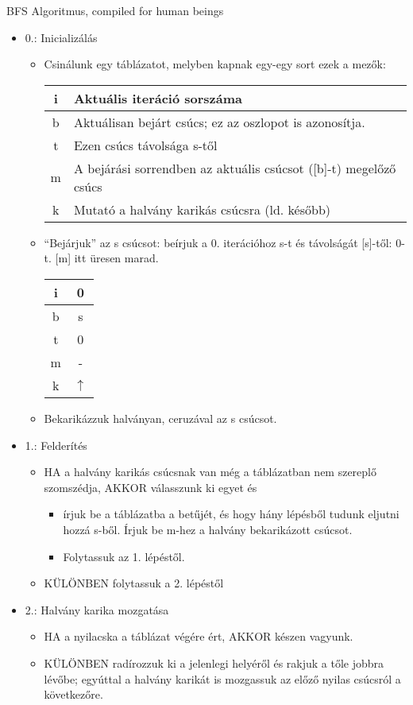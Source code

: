 \begin{tetel}{BFS Algoritmus, compiled for human beings}
  \begin{itemize}
  \item 0.: Inicializálás
    \begin{itemize}
    \item Csinálunk egy táblázatot, melyben kapnak egy-egy sort ezek a mezők:
      \begin{tabular}{c | l}
        i & Aktuális iteráció sorszáma  \\
        \hline
        b & Aktuálisan bejárt csúcs; ez az oszlopot is azonosítja. \\
        t & Ezen csúcs távolsága s-től \\
        m & A bejárási sorrendben az aktuális csúcsot ([b]-t) megelőző csúcs\\
        k & Mutató a halvány karikás csúcsra (ld. később)
      \end{tabular}
    \item ``Bejárjuk'' az s csúcsot: beírjuk a 0. iterációhoz s-t és távolságát [s]-től: 0-t. [m] itt üresen marad.

      \begin{tabular}{c | c}
        i & 0 \\
        \hline
        b & s \\
        t & 0 \\
        m & - \\
        k & $\uparrow$ \\
      \end{tabular}
      \item Bekarikázzuk halványan, ceruzával az s csúcsot.
    \end{itemize}
  \item 1.: Felderítés
    \begin{itemize}
    \item HA a halvány karikás csúcsnak van még a táblázatban nem szereplő szomszédja, AKKOR válasszunk ki egyet és
      \begin{itemize}
      \item írjuk be a táblázatba a betűjét, és hogy hány lépésből tudunk eljutni hozzá s-ből. Írjuk be m-hez a halvány bekarikázott csúcsot.
      \item Folytassuk az 1. lépéstől.
      \end{itemize}
    \item KÜLÖNBEN folytassuk a 2. lépéstől
    \end{itemize}
  \item 2.: Halvány karika mozgatása
    \begin{itemize}
      
    \item HA a nyilacska a táblázat végére ért, AKKOR készen vagyunk.
    \item KÜLÖNBEN radírozzuk ki a jelenlegi helyéről és rakjuk a tőle jobbra lévőbe; egyúttal a halvány karikát is mozgassuk az előző nyilas csúcsról a következőre.
    \end{itemize}
  \end{itemize}
\end{tetel}

